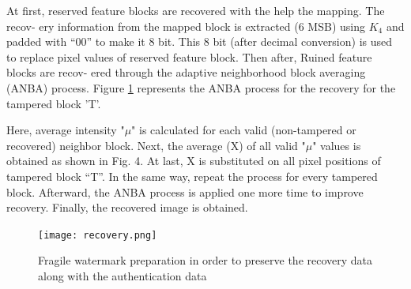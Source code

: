 \documentclass{article}
\begin{document}
At first, reserved feature blocks are recovered with the help the mapping. The recov- ery information from the mapped block is extracted (6 MSB) using $K_4$ and padded with “00” to make it 8 bit. This 8 bit (after decimal conversion) is used to replace pixel values of reserved feature block. Then after, Ruined feature blocks are recov- ered through the adaptive neighborhood block averaging (ANBA) process. Figure \ref{fig:recovery} represents the ANBA process for the recovery for the tampered block 'T'.

Here, average intensity "$\mu$" is calculated for each valid (non-tampered or recovered) neighbor block. Next, the average (X) of all valid "$\mu$" values is obtained as shown in Fig. 4. At last, X is substituted on all pixel positions of tampered block “T”. In the same way, repeat the process for every tampered block. Afterward, the ANBA process is applied one more time to improve recovery. Finally, the recovered image is obtained.


\begin{figure}[h]
    \centering
    \texttt{[image: recovery.png]}
    \caption{Fragile watermark preparation in order to preserve the recovery data along with the authentication data}
    \label{fig:recovery}
\end{figure}
\end{document}
